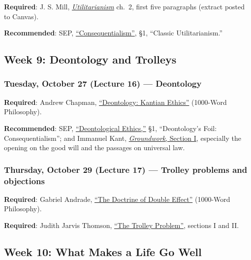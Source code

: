 \documentclass[
  letterpaper,
  DIV=11,
  numbers=noendperiod]{scrartcl}
\begin{document}
\textbf{Required}: J. S. Mill,
\href{https://utilitarianism.net/books/utilitarianism-john-stuart-mill/2/}{\emph{Utilitarianism}}
ch.~2, first five paragraphs (extract posted to Canvas).

\textbf{Recommended}: SEP,
\href{https://plato.stanford.edu/entries/consequentialism/}{``Consequentialism''},
§1, ``Classic Utilitarianism.''

\subsection{Week 9: Deontology and
Trolleys}\label{week-9-deontology-and-trolleys}

\subsubsection{Tuesday, October 27 (Lecture 16) ---
Deontology}\label{tuesday-october-27-lecture-16-deontology}

\textbf{Required}: Andrew Chapman,
\href{https://1000wordphilosophy.com/2014/06/09/introduction-to-deontology-kantian-ethics/}{``Deontology:
Kantian Ethics''} (1000-Word Philosophy).

\textbf{Recommended}: SEP,
\href{https://plato.stanford.edu/entries/ethics-deontological/}{``Deontological
Ethics,''} §1, ``Deontology's Foil: Consequentialism''; and Immanuel
Kant,
\href{https://www.earlymoderntexts.com/assets/pdfs/kant1785.pdf}{\emph{Groundwork},
Section I}, especially the opening on the good will and the passages on
universal law.

\subsubsection{Thursday, October 29 (Lecture 17) --- Trolley problems
and
objections}\label{thursday-october-29-lecture-17-trolley-problems-and-objections}

\textbf{Required}: Gabriel Andrade,
\href{https://1000wordphilosophy.com/2023/03/11/doctrine-of-double-effect/}{``The
Doctrine of Double Effect''} (1000-Word Philosophy).

\textbf{Required}: Judith Jarvis Thomson,
\href{https://openyls.law.yale.edu/handle/20.500.13051/16338}{``The
Trolley Problem''}, sections I and II.

\subsection{Week 10: What Makes a Life Go
Well}\label{week-10-what-makes-a-life-go-well}
\end{document}

